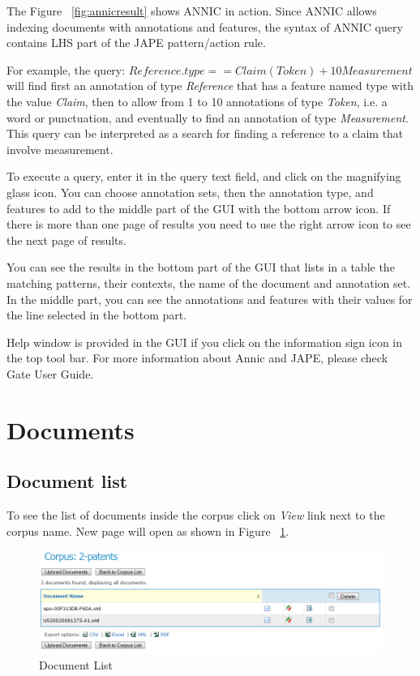 The Figure  ~\ref{fig:annicresult} shows ANNIC
in action. Since ANNIC allows indexing documents
with annotations and features, the syntax of ANNIC query contains LHS part
of the JAPE pattern/action rule.



For example, the query:
${Reference.type == Claim}({Token})+10{Measurement}$ will find first an
annotation of type \emph{Reference} that has a feature named type with the value
\emph{Claim}, then to allow from 1 to 10 annotations of type \emph{Token}, i.e.
a word or punctuation, and eventually to find an annotation of type
\emph{Measurement}. This query can be interpreted as a search for finding a
reference to a claim that involve measurement.

To execute a query, enter it in the query text field, and click
on the magnifying glass icon. You can choose annotation sets,
then the annotation type, and features to add to the middle part of the
GUI with the bottom arrow icon. If there is more than one page of results
you need to use the right arrow icon to see the next page of results.

You can see the results in the bottom part of the GUI that lists in a
table the matching patterns, their contexts, the name of the document
and annotation set. In the middle part, you can see the annotations
and features with their values for the line selected in the bottom part.

Help window is provided in the GUI if you click on the information
sign icon in the top tool bar. For more information about Annic and JAPE, please
check Gate User Guide.

\section{Documents}
\subsection{Document list}
To see the list of documents inside the corpus click on \emph{View} link next
to the corpus name. New page will open as shown in
Figure ~\ref{fig:documentlist}.
\begin{figure}[h]
\centering
\includegraphics[scale=0.5]{documentlist}
\caption{Document List}
\label{fig:documentlist}
\end{figure}

